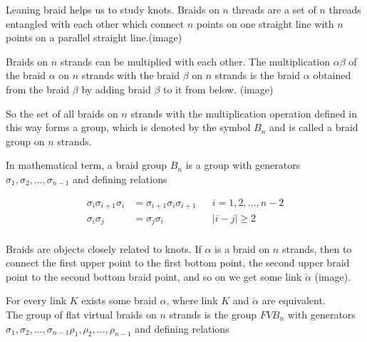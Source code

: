 \documentclass{article}
\begin{document}
Leaning braid helps us to study knots. Braids on $n$ threads are a set of  $n$ threads entangled with each other which connect $n$ points on one straight line with $n$ points on a parallel straight line.(image)



Braids on $n$ strands can be multiplied with each other. The multiplication $\alpha\beta$ of the braid $\alpha$ on $n$ strands with the braid $\beta$ on $n$ strands is the braid $\alpha$ obtained from the braid $\beta$  by adding braid $\beta$ to it from below. (image)



So the set of all braids on $n$ strands with the multiplication operation defined in this way forms a group, which is denoted by the symbol $B_n$ and is called a braid group on $n$ strands.



In mathematical term, a braid group $B_n$ is a group with generators $\sigma _1,\sigma _2,\dots,\sigma _{n-1}$ and defining relations 



\begin{align*}
\sigma_i\sigma_{i+1}\sigma_i &= \sigma_{i+1}\sigma _i\sigma _{i+1}&&i = 1, 2, \dots, n-2\\
\sigma_i\sigma_j &=\sigma_j\sigma_i&&|i-j|\geqslant   2\\
\end{align*}





Braids are objects closely related to knots. If $\alpha$ is a braid on $n$ strands, then to connect the first upper point to the first bottom point, the second upper braid point to the second bottom braid point, and so on we get some link $\check  \alpha$ (image).



For every link $K$ exists some braid $\alpha$, where link $K$ and $\check  \alpha$ are equivalent.\\





The group of flat virtual braids on $n$ strands is the group $FVB_n$ with generators  $\sigma _1,\sigma _2,\dots,\sigma _{n-1}\rho_1,\rho _2,\dots,\rho _{n-1}$ and defining relations 



\label{def}
\end{document}
